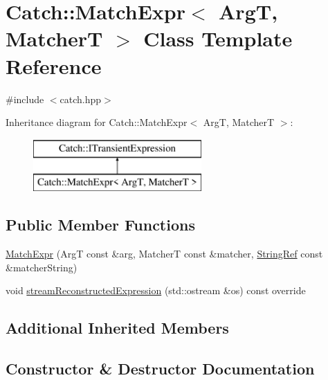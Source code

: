 \hypertarget{class_catch_1_1_match_expr}{}\section{Catch\+:\+:Match\+Expr$<$ ArgT, MatcherT $>$ Class Template Reference}
\label{class_catch_1_1_match_expr}


{\ttfamily \#include $<$catch.\+hpp$>$}

Inheritance diagram for Catch\+:\+:Match\+Expr$<$ ArgT, MatcherT $>$\+:\begin{figure}[H]
\begin{center}
\leavevmode
\includegraphics[height=2.000000cm]{class_catch_1_1_match_expr}
\end{center}
\end{figure}
\subsection*{Public Member Functions}
\begin{DoxyCompactItemize}
\item 
\mbox{\hyperlink{class_catch_1_1_match_expr_ae55ee9bf46c8676c65e9df291a98c345}{Match\+Expr}} (ArgT const \&arg, MatcherT const \&matcher, \mbox{\hyperlink{class_catch_1_1_string_ref}{String\+Ref}} const \&matcher\+String)
\item 
void \mbox{\hyperlink{class_catch_1_1_match_expr_ad3e41adb597750b2219bb37e51185629}{stream\+Reconstructed\+Expression}} (std\+::ostream \&os) const override
\end{DoxyCompactItemize}
\subsection*{Additional Inherited Members}


\subsection{Constructor \& Destructor Documentation}
\mbox{\label{class_catch_1_1_match_expr_ae55ee9bf46c8676c65e9df291a98c345}} 
